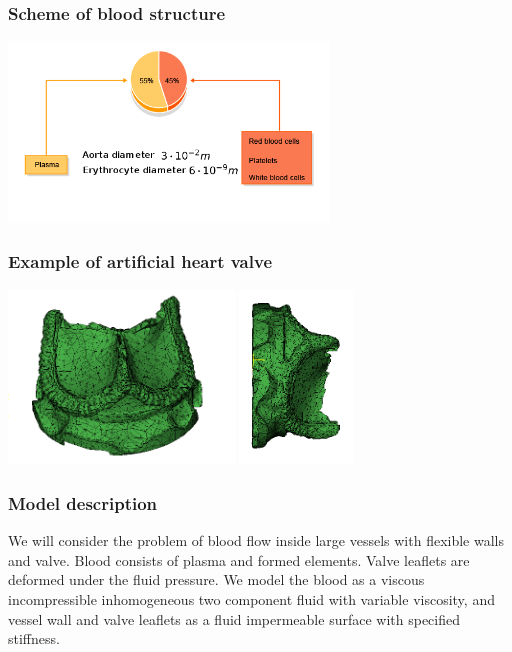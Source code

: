 \documentclass[14pt]{beamer}
\begin{document}
\begin{frame}
\frametitle{Scheme of blood structure}
    \begin{center}
        \includegraphics[width=8.5cm]{blood_scheme3.png}
    \end{center}
\end{frame}

\begin{frame}
\frametitle{Example of artificial heart valve}
    \begin{center}
        \includegraphics[width=6cm]{real_valve_3_1.png}
        \includegraphics[width=3cm]{real_valve2_1.png}
    \end{center}
\end{frame}

\begin{frame}
\frametitle{Model description}
We will consider the problem of blood flow inside large vessels with flexible walls and valve.
Blood consists of plasma and formed elements. Valve leaflets are deformed under the fluid pressure.
We model the blood as a viscous incompressible inhomogeneous two component fluid with variable viscosity,
and vessel wall and valve leaflets as a fluid impermeable surface with specified stiffness.
\end{frame}
\end{document}
